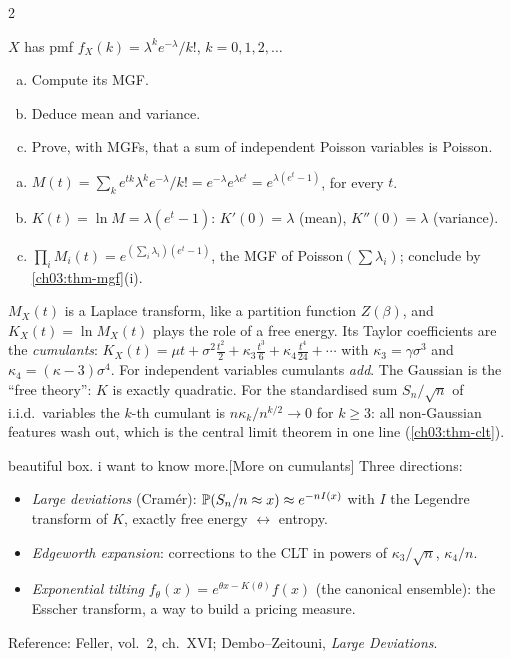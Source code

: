 \begin{paracol}{2}
\begin{exercise}\label{ch03:ex-poisson}
$X$ has pmf $f_X(k)=\lambda^ke^{-\lambda}/k!$, $k=0,1,2,\dots$
\begin{enumerate}[(a)]
  \item Compute its MGF.
  \item Deduce mean and variance.
  \item Prove, with MGFs, that a sum of independent Poisson
      variables is Poisson.
\end{enumerate}
\end{exercise}
\begin{solution}[ch03:ex-poisson]
\begin{enumerate}[(a)]
  \item $M(t)=\sum_k e^{tk}\lambda^ke^{-\lambda}/k!=e^{-\lambda}e^{\lambda e^t}=e^{\lambda(e^t-1)}$, for every $t$.
  \item $K(t)=\ln M=\lambda(e^t-1)$: $K'(0)=\lambda$ (mean), $K''(0)=\lambda$ (variance).
  \item $\prod_iM_i(t)=e^{(\sum_i\lambda_i)(e^t-1)}$, the MGF of Poisson$(\sum\lambda_i)$; conclude by \cref{ch03:thm-mgf}(i).
\end{enumerate}
\end{solution}

\begin{intuition}
$M_X(t)$ is a Laplace transform, like a partition function $Z(\beta)$, and $K_X(t)=\ln M_X(t)$ plays the role of
a free energy. Its Taylor coefficients are the \emph{cumulants}: $K_X(t)=\mu t+\sigma^2\frac{t^2}{2}+\kappa_3\frac{t^3}{6}+
\kappa_4\frac{t^4}{24}+\cdots$ with $\kappa_3=\gamma\sigma^3$ and $\kappa_4=(\kappa-3)\sigma^4$. For independent variables
cumulants \emph{add}. The Gaussian is the ``free theory'': $K$ is exactly quadratic. For the standardised sum
$S_n/\sqrt n$ of i.i.d.\ variables the $k$-th cumulant is $n\kappa_k/n^{k/2}\to0$ for $k\ge3$: all non-Gaussian
features wash out, which is the central limit theorem in one line (\cref{ch03:thm-clt}).
\end{intuition}\begin{answer}{beautiful box. i want to know more.}[More on cumulants]
Three directions:
\begin{itemize}
  \item \emph{Large deviations} (Cram\'er): $\mathbb{P}(S_n/n\approx x)\approx e^{-nI(x)}$ with $I$ the Legendre
        transform of $K$, exactly free energy $\leftrightarrow$ entropy.
  \item \emph{Edgeworth expansion}: corrections to the CLT in powers of $\kappa_3/\sqrt n$, $\kappa_4/n$.
  \item \emph{Exponential tilting} $f_\theta(x)=e^{\theta x-K(\theta)}f(x)$ (the canonical ensemble): the Esscher
        transform, a way to build a pricing measure.
\end{itemize}
Reference: Feller, vol.~2, ch.~XVI; Dembo--Zeitouni, \emph{Large Deviations}.
\end{answer}


\end{paracol}
